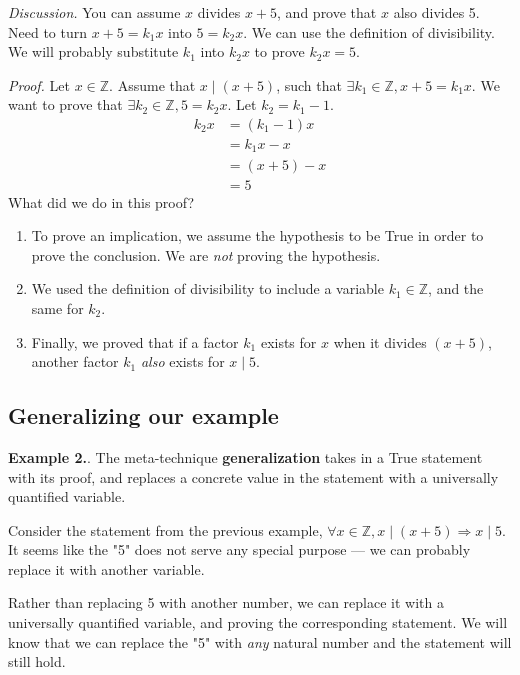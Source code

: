 \documentclass{article}
\newcounter{excount}
\newcommand\ex{\stepcounter{excount} \textbf{Example 2.\theexcount}. }
\begin{document}
\textit{Discussion.} You can assume $x$ divides $x + 5$, and prove that 
$x$ also divides 5. Need to turn $x+5 = k_1x$ into $5 = k_2x$. We can use the 
definition of divisibility. We will probably substitute $k_1$ into $k_2x$ to prove 
$k_2x = 5$.

\textit{Proof.} Let $x \in \mathbb{Z}$. Assume that $x \mid (x+5)$, such that 
$\exists k_1 \in \mathbb{Z}, x+5 = k_1x$. We want to prove that $\exists k_2 \in 
\mathbb{Z}, 5 = k_2x$. Let $k_2 = k_1 - 1$.
\begin{align*}
    k_2x &= (k_1 - 1)x \\
         &= k_1x - x \\
         &= (x + 5) - x \\
         &= 5
\end{align*}
What did we do in this proof? 
\begin{enumerate}
    \item To prove an implication, we assume the hypothesis to be True in order 
        to prove the conclusion. We are \textit{not} proving the hypothesis.
    \item We used the definition of divisibility to include a variable $k_1 
        \in \mathbb{Z}$, and the same for $k_2$.
    \item Finally, we proved that if a factor $k_1$ exists for $x$ when it divides 
        $(x+5)$, another factor $k_1$ \textit{also} exists for $x \mid 5$.
\end{enumerate}

\newpage 
\subsection{Generalizing our example}
\ex The meta-technique \textbf{generalization} takes in a True statement 
with its proof, and replaces a concrete value in the statement with a 
universally quantified variable.

Consider the statement from the previous example, $\forall x \in \mathbb{Z}, 
x \mid (x + 5) \Rightarrow x \mid 5$. It seems like the "5" does not serve 
any special purpose --- we can probably replace it with another variable. 

Rather than replacing 5 with another number, we can replace it with a 
universally quantified variable, and proving the corresponding statement. We 
will know that we can replace the "5" with \textit{any} natural number and 
the statement will still hold. 
\end{document}
